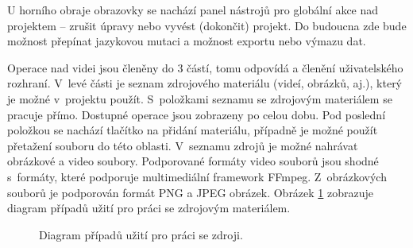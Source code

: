 U horního obraje obrazovky se nachází panel nástrojů pro globální akce nad projektem -- zrušit úpravy nebo vyvést (dokončit) projekt. Do budoucna zde bude možnost přepínat jazykovou mutaci a možnost exportu nebo výmazu dat.

Operace nad videi jsou členěny do 3 částí, tomu odpovídá a členění uživatelského rozhraní. V~levé části je seznam zdrojového materiálu (videí, obrázků, aj.), který je možné v~projektu použít. S~položkami seznamu se zdrojovým materiálem se pracuje přímo. Dostupné operace jsou zobrazeny po celou dobu. Pod poslední položkou se nachází tlačítko na přidání materiálu, případně je možné použít přetažení souboru do této oblasti. V~seznamu zdrojů je možné nahrávat obrázkové a video soubory. Podporované formáty video souborů jsou shodné s~formáty, které podporuje multimediální framework FFmpeg. Z~obrázkových souborů je podporován formát PNG a JPEG obrázek. Obrázek \ref{img:ucd-zdroj} zobrazuje diagram případů užití pro práci se zdrojovým materiálem.
\begin{figure}[h]
	\centering
	\caption{Diagram případů užití pro práci se zdroji.}\label{img:ucd-zdroj}
\end{figure}

